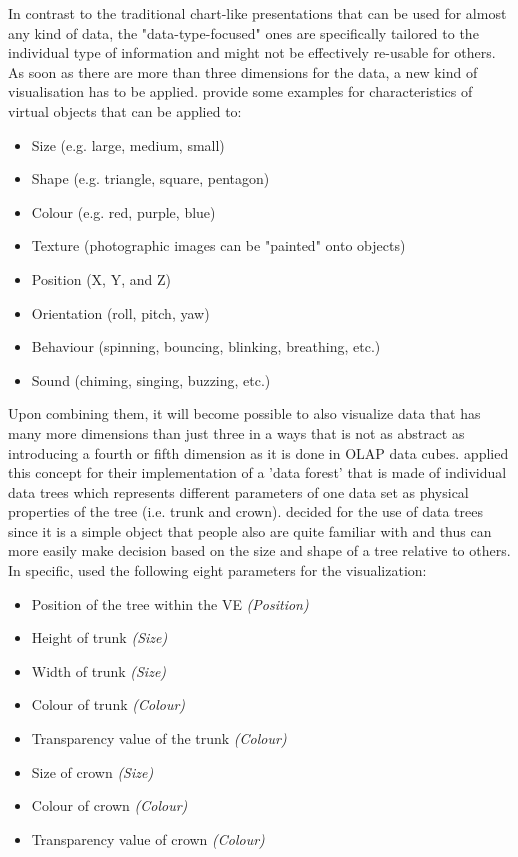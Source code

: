In contrast to the traditional chart-like presentations that can be used for almost any kind of data, the "data-type-focused" ones are specifically tailored to the individual type of information and might not be effectively re-usable for others. As soon as there are more than three dimensions for the data, a new kind of visualisation has to be applied. \cite{Stone1994} provide some examples for characteristics of virtual objects that can be applied to:
\begin{itemize}[noitemsep,nolistsep]
	\item Size (e.g. large, medium, small)
	\item Shape (e.g. triangle, square, pentagon)
	\item Colour (e.g. red, purple, blue)
	\item Texture (photographic images can be "painted" onto objects)
	\item Position (X, Y, and Z)
	\item Orientation (roll, pitch, yaw)
	\item Behaviour (spinning, bouncing, blinking, breathing, etc.)
	\item Sound (chiming, singing, buzzing, etc.)
\end{itemize}
Upon combining them, it will become possible to also visualize data that has many more dimensions than just three in a ways that is not as abstract as introducing a fourth or fifth dimension as it is done in OLAP data cubes. \cite{Jamieson2007} applied this concept for their implementation of a 'data forest' that is made of individual data trees which represents different parameters of one data set as physical properties of the tree (i.e. trunk and crown). \cite{Jamieson2007} decided for the use of data trees since it is a simple object that people also are quite familiar with and thus can more easily make decision based on the size and shape of a tree relative to others. In specific, \cite{Jamieson2007} used the following eight parameters for the visualization:
\begin{itemize}[noitemsep,nolistsep]
	\item Position of the tree within the VE \textit{(Position)}
	\item Height of trunk \textit{(Size)}
	\item Width of trunk \textit{(Size)}
	\item Colour of trunk \textit{(Colour)}
	\item Transparency value of the trunk \textit{(Colour)}
	\item Size of crown \textit{(Size)}
	\item Colour of crown  \textit{(Colour)}
	\item Transparency value of crown  \textit{(Colour)}
\end{itemize}
